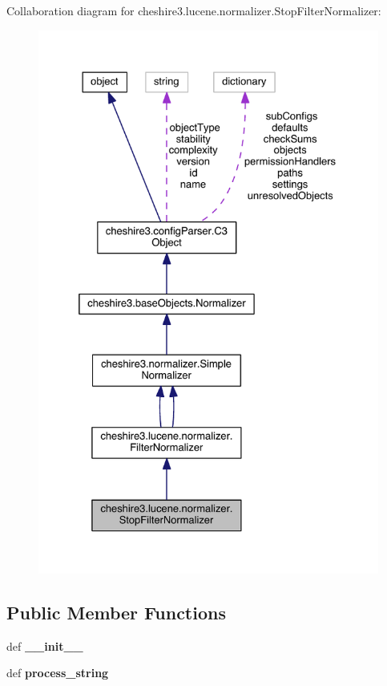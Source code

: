 Collaboration diagram for cheshire3.\-lucene.\-normalizer.\-Stop\-Filter\-Normalizer\-:
\nopagebreak
\begin{figure}[H]
\begin{center}
\leavevmode
\includegraphics[width=328pt]{classcheshire3_1_1lucene_1_1normalizer_1_1_stop_filter_normalizer__coll__graph}
\end{center}
\end{figure}
\subsection*{Public Member Functions}
\begin{DoxyCompactItemize}
\item 
\hypertarget{classcheshire3_1_1lucene_1_1normalizer_1_1_stop_filter_normalizer_a18e2b0935ede5323d379202629761f3c}{def {\bfseries \-\_\-\-\_\-init\-\_\-\-\_\-}}\label{classcheshire3_1_1lucene_1_1normalizer_1_1_stop_filter_normalizer_a18e2b0935ede5323d379202629761f3c}

\item 
\hypertarget{classcheshire3_1_1lucene_1_1normalizer_1_1_stop_filter_normalizer_ad3bf57c1b10cb1a3d0a11b222b4c9e37}{def {\bfseries process\-\_\-string}}\label{classcheshire3_1_1lucene_1_1normalizer_1_1_stop_filter_normalizer_ad3bf57c1b10cb1a3d0a11b222b4c9e37}

\end{DoxyCompactItemize}
